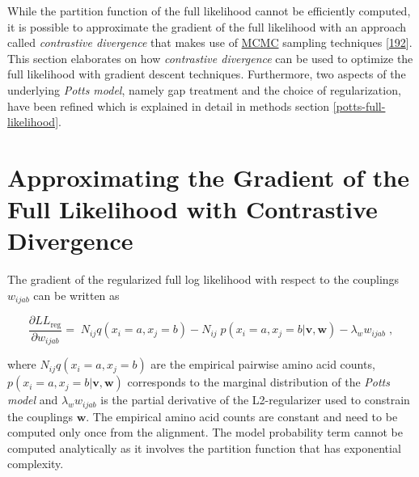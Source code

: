\documentclass[11pt,a4paper,twoside]{book}
\newcommand{\eq}{\!=\!}
\newcommand{\LLreg}{L\!L_\mathrm{reg}}
\renewcommand{\v}{\mathbf{v}}
\newcommand{\w}{\mathbf{w}}
\newcommand{\wijab}{w_{ijab}}
\theoremstyle{definition}
\theoremstyle{definition}
\theoremstyle{remark}
\begin{document}
While the partition function of the full likelihood cannot be
efficiently computed, it is possible to approximate the gradient of the
full likelihood with an approach called \emph{contrastive divergence}
that makes use of \protect\hyperlink{abbrev}{MCMC} sampling techniques
{[}\protect\hyperlink{ref-Hinton2002}{192}{]}. This section elaborates
on how \emph{contrastive divergence} can be used to optimize the full
likelihood with gradient descent techniques. Furthermore, two aspects of
the underlying \emph{Potts model}, namely gap treatment and the choice
of regularization, have been refined which is explained in detail in
methods section \ref{potts-full-likelihood}.

\section{Approximating the Gradient of the Full Likelihood with
Contrastive Divergence}\label{full-likelihood-gradient}

The gradient of the regularized full log likelihood with respect to the
couplings \(\wijab\) can be written as

\begin{equation}
    \frac{\partial \LLreg}{\partial \wijab} = \; N_{ij} q(x_i \eq a, x_j=b) - N_{ij} \; p(x_i \eq a, x_j \eq b | \v,\w) - \lambda_w \wijab  \; ,
\label{eq:gradient-wijab-full-likelihood-approx}
\end{equation}

where \(N_{ij} q(x_i \eq a, x_j=b)\) are the empirical pairwise amino
acid counts, \(p(x_i \eq a, x_j \eq b | \v,\w)\) corresponds to the
marginal distribution of the \emph{Potts model} and \(\lambda_w \wijab\)
is the partial derivative of the L2-regularizer used to constrain the
couplings \(\w\). The empirical amino acid counts are constant and need
to be computed only once from the alignment. The model probability term
cannot be computed analytically as it involves the partition function
that has exponential complexity.
\end{document}

